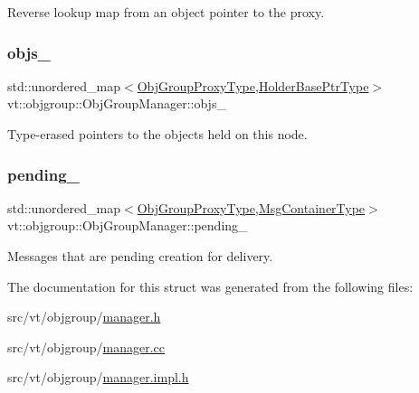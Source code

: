 Reverse lookup map from an object pointer to the proxy. 

\mbox{\label{structvt_1_1objgroup_1_1_obj_group_manager_a7d061065440ad2a2379b85b94705fa36}} 
\subsubsection{\texorpdfstring{objs\+\_\+}{objs\_}}
{\footnotesize\ttfamily std\+::unordered\+\_\+map$<$\hyperlink{namespacevt_ad7cae989df485fccca57f0792a880a8e}{Obj\+Group\+Proxy\+Type},\hyperlink{structvt_1_1objgroup_1_1_obj_group_manager_ac1e9bb19d4a5923dd6d595bad28f04c9}{Holder\+Base\+Ptr\+Type}$>$ vt\+::objgroup\+::\+Obj\+Group\+Manager\+::objs\+\_\+\hspace{0.3cm}{\ttfamily [private]}}



Type-\/erased pointers to the objects held on this node. 

\mbox{\label{structvt_1_1objgroup_1_1_obj_group_manager_a0254917542e76ec489eb3c5ca6dcf0cd}} 
\subsubsection{\texorpdfstring{pending\+\_\+}{pending\_}}
{\footnotesize\ttfamily std\+::unordered\+\_\+map$<$\hyperlink{namespacevt_ad7cae989df485fccca57f0792a880a8e}{Obj\+Group\+Proxy\+Type},\hyperlink{structvt_1_1objgroup_1_1_obj_group_manager_ab89e17bd301b2aa684fce22f0b4af30a}{Msg\+Container\+Type}$>$ vt\+::objgroup\+::\+Obj\+Group\+Manager\+::pending\+\_\+\hspace{0.3cm}{\ttfamily [private]}}



Messages that are pending creation for delivery. 



The documentation for this struct was generated from the following files\+:\begin{DoxyCompactItemize}
\item 
src/vt/objgroup/\hyperlink{objgroup_2manager_8h}{manager.\+h}\item 
src/vt/objgroup/\hyperlink{objgroup_2manager_8cc}{manager.\+cc}\item 
src/vt/objgroup/\hyperlink{objgroup_2manager_8impl_8h}{manager.\+impl.\+h}\end{DoxyCompactItemize}
